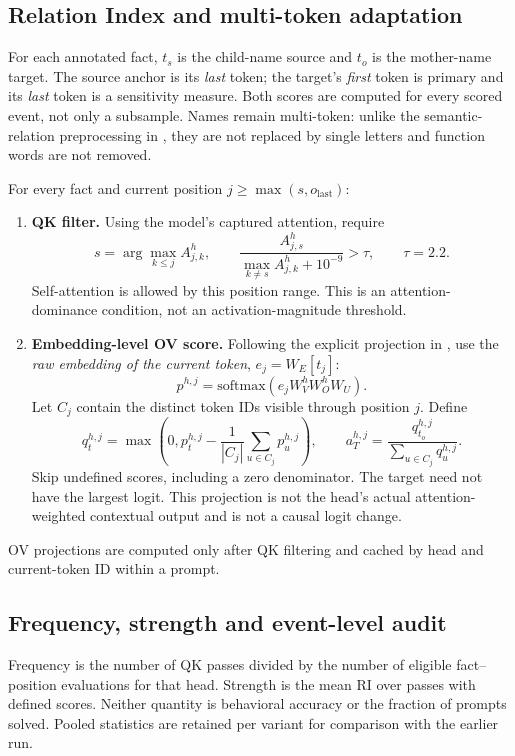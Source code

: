\documentclass[11pt,a4paper]{article}
\begin{document}
\subsection{Relation Index and multi-token adaptation}
For each annotated fact, $t_s$ is the child-name source and $t_o$ is the mother-name target. The source anchor is its \emph{last} token; the target's \emph{first} token is primary and its \emph{last} token is a sensitivity measure. Both scores are computed for every scored event, not only a subsample. Names remain multi-token: unlike the semantic-relation preprocessing in \cite{ren}, they are not replaced by single letters and function words are not removed.

For every fact and current position $j\ge\max(s,o_{\mathrm{last}})$:
\begin{enumerate}[itemsep=1pt]
\item \textbf{QK filter.} Using the model's captured attention, require
\begin{equation}
s=\arg\max_{k\le j} A^h_{j,k},\qquad
\frac{A^h_{j,s}}{\max_{k\ne s} A^h_{j,k}+10^{-9}}>\tau,\qquad \tau=2.2.
\end{equation}
Self-attention is allowed by this position range. This is an attention-dominance condition, not an activation-magnitude threshold.
\item \textbf{Embedding-level OV score.} Following the explicit projection in \cite{ren}, use the \emph{raw embedding of the current token}, $e_j=W_E[t_j]$:
\begin{equation}
p^{h,j}=\mathrm{softmax}(e_jW_V^hW_O^hW_U).
\end{equation}
Let $C_j$ contain the distinct token IDs visible through position $j$. Define
\begin{equation}
q_t^{h,j}=\max\left(0,p_t^{h,j}-\frac{1}{|C_j|}\sum_{u\in C_j}p_u^{h,j}\right),
\qquad a^{h,j}_{T}=\frac{q_{t_o}^{h,j}}{\sum_{u\in C_j}q_u^{h,j}}.
\end{equation}
Skip undefined scores, including a zero denominator. The target need not have the largest logit. This projection is not the head's actual attention-weighted contextual output and is not a causal logit change.
\end{enumerate}
OV projections are computed only after QK filtering and cached by head and current-token ID within a prompt.

\subsection{Frequency, strength and event-level audit}
Frequency is the number of QK passes divided by the number of eligible fact--position evaluations for that head. Strength is the mean RI over passes with defined scores. Neither quantity is behavioral accuracy or the fraction of prompts solved. Pooled statistics are retained per variant for comparison with the earlier run.
\end{document}
